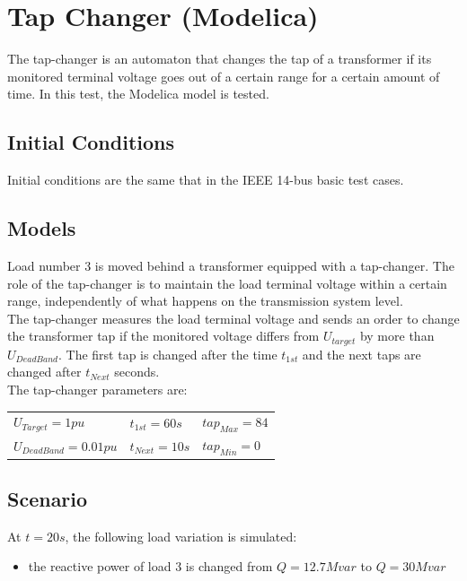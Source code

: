 \documentclass[a4paper, 12pt]{report}
\begin{document}
\newpage
\section{Tap Changer (Modelica)}
\label{TapChangerAutomatonModelica}

The tap-changer is an automaton that changes the tap of a transformer if its monitored terminal voltage goes out of a certain range for a certain amount of time. In this test, the Modelica model is tested.

\subsection{Initial Conditions}

Initial conditions are the same that in the IEEE 14-bus basic test cases.

\subsection{Models}

Load number 3 is moved behind a transformer equipped with a tap-changer. The role of the tap-changer is to maintain the load terminal voltage within a certain range, independently of what happens on the transmission system level. \\

The tap-changer measures the load terminal voltage and sends an order to change the transformer tap if the monitored voltage differs from $U_{target}$ by more than $U_{DeadBand}$. The first tap is changed after the time $t_{1st}$ and the next taps are changed after $t_{Next}$ seconds.\\

The tap-changer parameters are:
\begin{center}
\begin{tabular}{l|l|l}
   $U_{Target}=1pu$ & $t_{1st}=60s$ & $tap_{Max}=84$ \\
   $U_{DeadBand}=0.01pu$  & $t_{Next}=10s$ & $tap_{Min}=0$ \\
\end{tabular}
\end{center}

\subsection{Scenario}
At $t=20s$, the following load variation is simulated:
\begin{itemize}
\item{the reactive power of load 3 is changed from $Q=12.7Mvar$ to $Q=30Mvar$}
\end{itemize}
\end{document}
